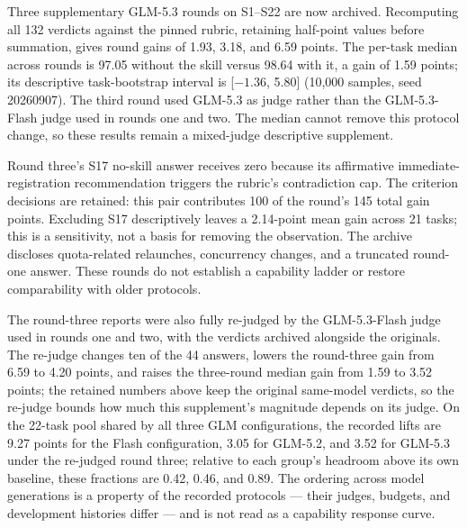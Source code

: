 \documentclass[11pt]{article}
\begin{document}
Three supplementary GLM-5.3 rounds on S1--S22 are now archived. Recomputing all 132 verdicts against the pinned rubric, retaining half-point values before summation, gives round gains of 1.93, 3.18, and 6.59 points. The per-task median across rounds is 97.05 without the skill versus 98.64 with it, a gain of 1.59 points; its descriptive task-bootstrap interval is [$-1.36$, 5.80] (10,000 samples, seed 20260907). The third round used GLM-5.3 as judge rather than the GLM-5.3-Flash judge used in rounds one and two. The median cannot remove this protocol change, so these results remain a mixed-judge descriptive supplement.

Round three's S17 no-skill answer receives zero because its affirmative immediate-registration recommendation triggers the rubric's contradiction cap. The criterion decisions are retained: this pair contributes 100 of the round's 145 total gain points. Excluding S17 descriptively leaves a 2.14-point mean gain across 21 tasks; this is a sensitivity, not a basis for removing the observation. The archive discloses quota-related relaunches, concurrency changes, and a truncated round-one answer. These rounds do not establish a capability ladder or restore comparability with older protocols.

The round-three reports were also fully re-judged by the GLM-5.3-Flash judge used in rounds one and two, with the verdicts archived alongside the originals. The re-judge changes ten of the 44 answers, lowers the round-three gain from 6.59 to 4.20 points, and raises the three-round median gain from 1.59 to 3.52 points; the retained numbers above keep the original same-model verdicts, so the re-judge bounds how much this supplement's magnitude depends on its judge. On the 22-task pool shared by all three GLM configurations, the recorded lifts are 9.27 points for the Flash configuration, 3.05 for GLM-5.2, and 3.52 for GLM-5.3 under the re-judged round three; relative to each group's headroom above its own baseline, these fractions are 0.42, 0.46, and 0.89. The ordering across model generations is a property of the recorded protocols --- their judges, budgets, and development histories differ --- and is not read as a capability response curve.
\end{document}

